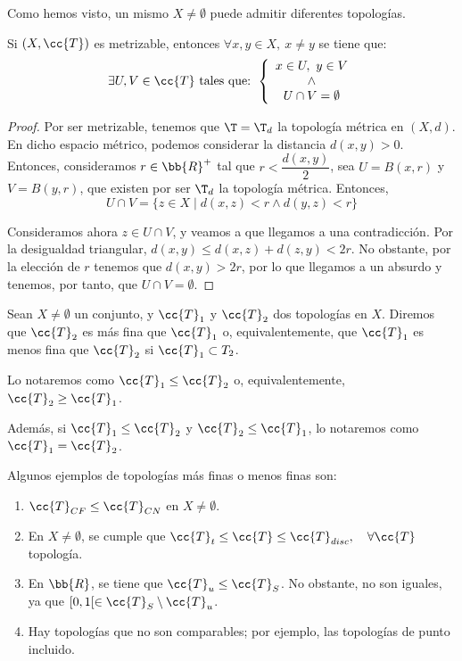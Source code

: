 Como hemos visto, un mismo $X\neq \emptyset$ puede admitir diferentes topologías.


\begin{lema}\label{lema:Metrizable}
    Si $(X,\cc{T})$ es metrizable, entonces $\forall x,y\in X,~x\neq y$ se tiene que:
    \begin{equation*}
        \exists U,V\in \cc{T} \text{ tales que: }
        \left\{
        \begin{array}{c}
            x\in U,~y\in V\\
            \land\\
            U\cap V=\emptyset
        \end{array}
        \right.
    \end{equation*}
\end{lema}
\begin{proof}
    Por ser metrizable, tenemos que $\T=\T_d$ la topología métrica en $(X,d)$. En dicho espacio métrico, podemos considerar la distancia $d(x,y)>0$. Entonces, consideramos $r\in \bb{R}^+$ tal que $r<\dfrac{d(x,y)}{2}$, sea $U=B(x,r)$ y $V=B(y,r)$, que existen por ser $\T_d$ la topología métrica. Entonces,
    $$U\cap V = \{z\in X\mid d(x,z)<r \land d(y,z)<r\}$$

    Consideramos ahora $z\in U\cap V$, y veamos a que llegamos a una contradicción. Por la desigualdad triangular, $d(x,y)\leq d(x,z) + d(z,y)<2r$. No obstante, por la elección de $r$ tenemos que $d(x,y)>2r$, por lo que llegamos a un absurdo y tenemos, por tanto, que $U\cap V=\emptyset$.
\end{proof}


\begin{definicion}
    Sean $X\neq \emptyset$ un conjunto, y $\cc{T}_1$ y $\cc{T}_2$ dos topologías en $X$.
    Diremos que $\cc{T}_2$ es más fina que $\cc{T}_1$ o, equivalentemente, que $\cc{T}_1$ es menos fina que $\cc{T}_2$ si $\cc{T}_1\subset T_2$.

    Lo notaremos como $\cc{T}_1\leq \cc{T}_2$ o, equivalentemente, $\cc{T}_2\geq \cc{T}_1$.

    Además, si $\cc{T}_1\leq \cc{T}_2$ y $\cc{T}_2\leq \cc{T}_1$, lo notaremos como $\cc{T}_1=\cc{T}_2$.
\end{definicion}
\begin{ejemplo}
    Algunos ejemplos de topologías más finas o menos finas son:
    \begin{enumerate}
        \item $\cc{T}_{CF}\leq \cc{T}_{CN}$ en $X\neq \emptyset$.
        \item En $X\neq \emptyset$, se cumple que $\cc{T}_t\leq \cc{T}\leq \cc{T}_{disc},\quad \forall \cc{T}$ topología.
        \item En $\bb{R}$, se tiene que $\cc{T}_u\leq \cc{T}_S$. No obstante, no son iguales, ya que $[0,1[\in \cc{T}_S\setminus \cc{T}_u$.
        \item Hay topologías que no son comparables; por ejemplo, las topologías de punto incluido.
    \end{enumerate}
\end{ejemplo}



